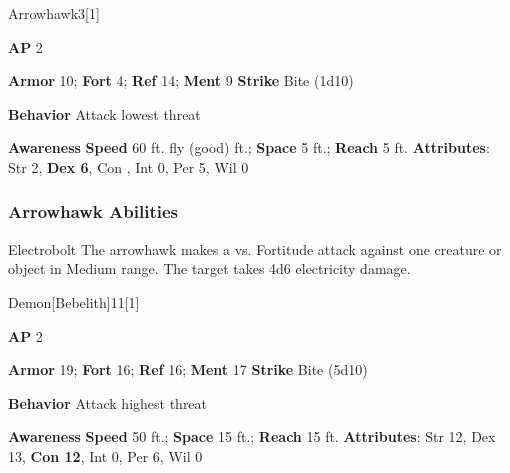 \begin{monsection}{Arrowhawk}{3}[1]
\vspace{-1em}\vspace{-1em}
\begin{spellcontent}
\begin{spelltargetinginfo}
{\textbf{AP} 2}

\pari \textbf{Armor} 10;
\textbf{Fort} 4;
\textbf{Ref} 14;
\textbf{Ment} 9
\pari \textbf{Strike} Bite  (1d10)



\pari \textbf{Behavior} Attack lowest threat
\end{spelltargetinginfo}
\end{spellcontent}

\begin{monsterfooter}
\pari \textbf{Awareness} 
\pari \textbf{Speed} 60 ft. fly (good) ft.;
\textbf{Space} 5 ft.;
\textbf{Reach} 5 ft.
\pari \textbf{Attributes}:
Str 2,
\textbf{Dex 6},
Con ,
Int 0,
Per 5,
Wil 0
\end{monsterfooter}
\end{monsection}


\subsubsection{Arrowhawk Abilities}

\begin{freeability}{Electrobolt}
The arrowhawk makes a  vs. Fortitude attack against one creature or object in Medium range.
\hit The target takes 4d6 electricity damage.
\end{freeability}

\begin{monsection}{Demon}[Bebelith]{11}[1]
\vspace{-1em}\vspace{-1em}
\begin{spellcontent}
\begin{spelltargetinginfo}
{\textbf{AP} 2}

\pari \textbf{Armor} 19;
\textbf{Fort} 16;
\textbf{Ref} 16;
\textbf{Ment} 17
\pari \textbf{Strike} Bite  (5d10)



\pari \textbf{Behavior} Attack highest threat
\end{spelltargetinginfo}
\end{spellcontent}

\begin{monsterfooter}
\pari \textbf{Awareness} 
\pari \textbf{Speed} 50 ft.;
\textbf{Space} 15 ft.;
\textbf{Reach} 15 ft.
\pari \textbf{Attributes}:
Str 12,
Dex 13,
\textbf{Con 12},
Int 0,
Per 6,
Wil 0
\end{monsterfooter}
\end{monsection}


